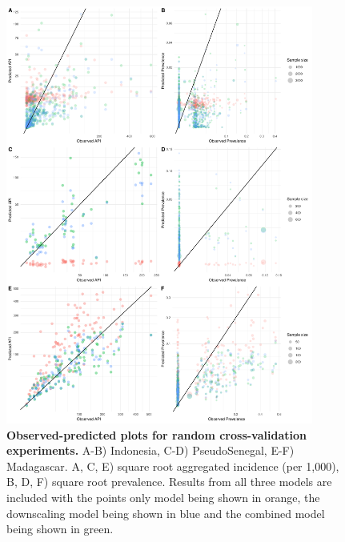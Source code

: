 \documentclass[10pt,letterpaper]{article}
\begin{document}
\begin{figure}[!t]
\includegraphics[width = 0.9\textwidth]{figures/random_cv_scatter.pdf} %
\caption{{\bf Observed-predicted plots for random cross-validation experiments.}
A-B) Indonesia, C-D) PseudoSenegal, E-F) Madagascar. A, C, E) square root aggregated incidence (per 1,000), B, D, F) square root prevalence.
Results from all three models are included with the points only model being shown in orange, the downscaling model being shown in blue and the combined model being shown in green.
}
\label{randompredobsscatter}
\end{figure}
\end{document}
